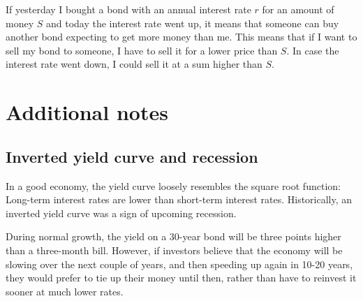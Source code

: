 If yesterday I bought a bond with an annual interest rate $r$ for an amount of money $S$ and today the interest rate went up, it means that someone can buy another bond expecting to get more money than me. This means that if I want to sell my bond to someone, I have to sell it for a lower price than $S$. In case the interest rate went down, I could sell it at a sum higher than $S$.

\section{Additional notes}

\subsection{Inverted yield curve and recession}
In a good economy, the yield curve loosely resembles the square root function: Long-term interest rates are lower than short-term interest rates. Historically, an inverted yield curve was a sign of upcoming recession.

During normal growth, the yield on a 30-year bond will be three points higher than a three-month bill. However, if investors believe that the economy will be slowing over the next couple of years, and then speeding up again in 10-20 years, they would prefer to tie up their money until then, rather than have to reinvest it sooner at much lower rates.

